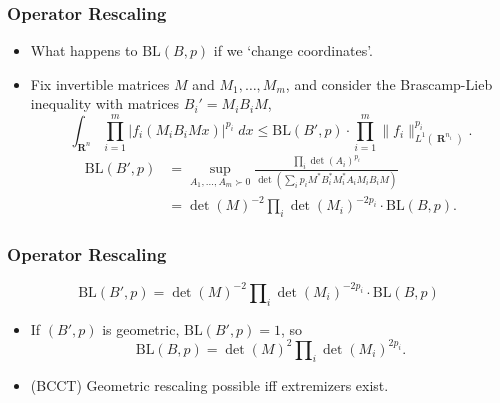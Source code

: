 \documentclass[handout,usenames,dvipsnames,12pt]{beamer}
\DeclareMathOperator{\RR}{\mathbf{R}}
\begin{document}
\begin{frame}
    \frametitle{Operator Rescaling}

    \begin{itemize}
        \item What happens to $\text{BL}(B,p)$ if we `change coordinates'.

        \pause
        \item Fix invertible matrices $M$ and $M_1, \dots, M_m$, and consider the Brascamp-Lieb inequality with matrices $B_i' = M_i B_i M$,
        \[ \int_{\RR^n} \prod_{i = 1}^m |f_i(M_i B_i M x)|^{p_i}\; dx \leq \text{BL}(B',p) \cdot \prod_{i = 1}^m \| f_i \|_{L^1(\RR^{n_i})}^{p_i}. \]
        \pause
        \begin{align*}
            \text{BL}(B',p) &= \sup_{A_1,\dots,A_m \succ 0} \frac{\prod_i \det(A_i)^{p_i}}{\det(\sum_i p_i M^* B_i^* M_i^* A_i M_i B_i M)}\\
            &= \det(M)^{-2} \prod_i \det(M_i)^{-2p_i} \cdot \text{BL}(B,p). 
        \end{align*}
    \end{itemize}
\end{frame}

\begin{frame}
    \frametitle{Operator Rescaling}

    \[ \text{BL}(B',p) = \det(M)^{-2} \prod\nolimits_i \det(M_i)^{-2p_i} \cdot \text{BL}(B,p) \]

    \begin{itemize}
        \pause
        \item If $(B',p)$ is geometric, $\text{BL}(B',p) = 1$, so
        \[ \text{BL}(B,p) = \det(M)^2 \prod\nolimits_i \det(M_i)^{2p_i}. \]

        \pause
        \item (BCCT) Geometric rescaling possible iff extremizers exist.
    \end{itemize}
\end{frame}
\end{document}
